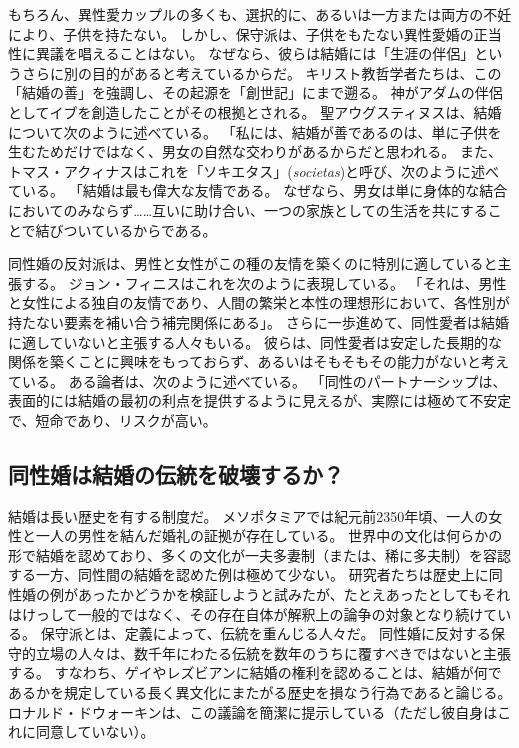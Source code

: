 \documentclass[paper=a4,book,openany]{jlreq} \usepackage{mystyle}
\begin{document}
もちろん、異性愛カップルの多くも、選択的に、あるいは一方または両方の不妊により、子供を持たない。
しかし、保守派は、子供をもたない異性愛婚の正当性に異議を唱えることはない。
なぜなら、彼らは結婚には「生涯の伴侶」というさらに別の目的があると考えているからだ。
キリスト教哲学者たちは、この「結婚の善」を強調し、その起源を「創世記」にまで遡る。
神がアダムの伴侶としてイブを創造したことがその根拠とされる。
聖アウグスティヌスは、結婚について次のように述べている。
「私には、結婚が善であるのは、単に子供を生むためだけではなく、男女の自然な交わりがあるからだと思われる\citep[3.3]{augustine98:_excel_marriag}。
また、トマス・アクィナスはこれを「ソキエタス」(\emph{societas})と呼び、次のように述べている。
「結婚は最も偉大な友情である。
なぜなら、男女は単に身体的な結合においてのみならず……互いに助け合い、一つの家族としての生活を共にすることで結びついているからである\citep[III c. 123 n. 6 (2964)]{aquinas55:_summa_gentil}。

同性婚の反対派は、男性と女性がこの種の友情を築くのに特別に適していると主張する。
ジョン・フィニスはこれを次のように表現している。
「それは、男性と女性による独自の友情であり、人間の繁栄と本性の理想形において、各性別が持たない要素を補い合う補完関係にある」\citep[p.398]{finnis08:_marriag}。
さらに一歩進めて、同性愛者は結婚に適していないと主張する人々もいる。
彼らは、同性愛者は安定した長期的な関係を築くことに興味をもっておらず、あるいはそもそもその能力がないと考えている。
ある論者は、次のように述べている。
「同性のパートナーシップは、表面的には結婚の最初の利点を提供するように見えるが、実際には極めて不安定で、短命であり、リスクが高い\citep{fischer13:_purpos_marriag}。

\subsection{同性婚は結婚の伝統を破壊するか？}

結婚は長い歴史を有する制度だ。
メソポタミアでは紀元前2350年頃、一人の女性と一人の男性を結んだ婚礼の証拠が存在している。
世界中の文化は何らかの形で結婚を認めており、多くの文化が一夫多妻制（または、稀に多夫制）を容認する一方、同性間の結婚を認めた例は極めて少ない。
研究者たちは歴史上に同性婚の例があったかどうかを検証しようと試みたが、たとえあったとしてもそれはけっして一般的ではなく、その存在自体が解釈上の論争の対象となり続けている\citep{boswell94:_same_sex_union_pre_moder_europ,shaw94:_review_boswel}。
保守派とは、定義によって、伝統を重んじる人々だ。
同性婚に反対する保守的立場の人々は、数千年にわたる伝統を数年のうちに覆すべきではないと主張する。
すなわち、ゲイやレズビアンに結婚の権利を認めることは、結婚が何であるかを規定している長く異文化にまたがる歴史を損なう行為であると論じる。
ロナルド・ドウォーキンは、この議論を簡潔に提示している（ただし彼自身はこれに同意していない）。
\end{document}

